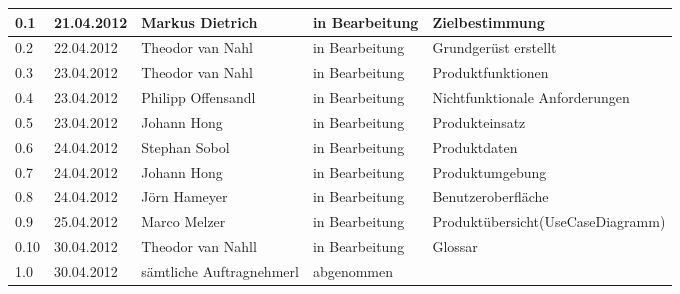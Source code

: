 \begin{longtable}{|m{1.78cm}|m{1.59cm}|m{2.86cm}|m{1.9cm}|m{5.25cm}|}
  0.1   &   21.04.2012     &   Markus Dietrich       &   in Bearbeitung    &  Zielbestimmung    \\       %
  \hline                                              %
  0.2   &   22.04.2012     &   Theodor van Nahl   &   in Bearbeitung    &  Grundgerüst erstellt   \\       %
  \hline                                              %
  0.3   &   23.04.2012     &   Theodor van Nahl   &   in Bearbeitung    &  Produktfunktionen   \\       %
  \hline                                              %
  0.4   &   23.04.2012     &   Philipp Offensandl   &   in Bearbeitung    &  Nichtfunktionale Anforderungen   \\       %
  \hline                                              %
  0.5   &   23.04.2012     &   Johann Hong           &   in Bearbeitung    &  Produkteinsatz   \\       %
  \hline                                              %
  0.6   &   24.04.2012     &   Stephan Sobol         &   in Bearbeitung    &  Produktdaten  \\       %
  \hline                                              %
  0.7   &   24.04.2012     &   Johann Hong           &   in Bearbeitung    &  Produktumgebung   \\       %
  \hline                                              %
  0.8   &   24.04.2012     &   Jörn Hameyer          &   in Bearbeitung    &  Benutzeroberfläche   \\       %
  \hline                                              %
  0.9   &   25.04.2012     &   Marco Melzer           &   in Bearbeitung    &  Produktübersicht(UseCaseDiagramm)   \\       %
  \hline                                              %
  0.10 &   30.04.2012     &   Theodor van Nahll   &   in Bearbeitung    &  Glossar   \\       %
  \hline                                              %
  1.0   &   30.04.2012     &   sämtliche Auftragnehmerl   &   abgenommen    &     \\       %
  \hline                                              %
\end{longtable}


